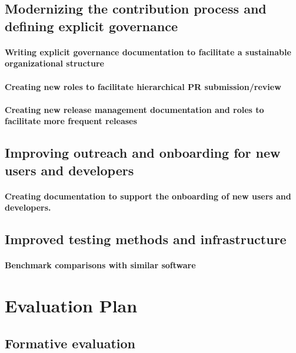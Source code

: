 \documentclass[numbers]{proposalnsf}
\begin{document}
\subsection{Modernizing the contribution process and defining explicit governance}


\paragraph{Writing explicit governance documentation to facilitate a sustainable organizational structure}

\paragraph{Creating new roles to facilitate hierarchical PR submission/review}

\paragraph{Creating new release management documentation and roles to facilitate more frequent releases}

\subsection{Improving outreach and onboarding for new users and developers}

\paragraph{Creating documentation to support the onboarding of new users and developers.} \label{sec:doc}

\subsection{Improved testing methods and infrastructure}

\paragraph{Benchmark comparisons with similar software}


\section{Evaluation Plan} \label{sec:eval}

\subsection{Formative evaluation}
\end{document}

